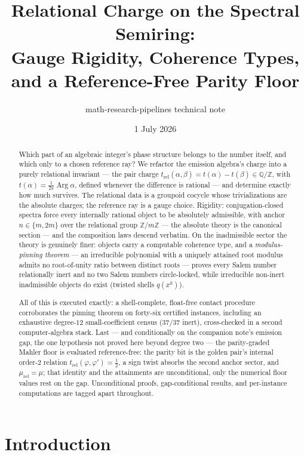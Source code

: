 \documentclass[11pt]{article}
\title{Relational Charge on the Spectral Semiring:\\
Gauge Rigidity, Coherence Types, and a Reference-Free Parity Floor}
\author{math-research-pipelines technical note}
\date{1 July 2026}
\theoremstyle{plain}
\theoremstyle{definition}
\theoremstyle{remark}
\newcommand{\Q}{\mathbb{Q}}
\newcommand{\Z}{\mathbb{Z}}
\DeclareMathOperator{\Arg}{Arg}
\begin{document}
\maketitle

\begin{abstract}
Which part of an algebraic integer's phase structure belongs to the number
itself, and which only to a chosen reference ray? We refactor the emission
algebra's charge into a purely relational invariant --- the pair charge
$t_{\mathrm{rel}}(\alpha,\beta)=t(\alpha)-t(\beta)\in\Q/\Z$, with
$t(\alpha)=\frac{1}{2\pi}\Arg\alpha$, defined whenever the difference is
rational --- and determine exactly how much
survives. The relational data is a groupoid cocycle whose trivializations
are the absolute charges; the reference ray is a gauge choice. Rigidity:
conjugation-closed spectra force every internally rational object to be
absolutely admissible, with anchor $n\in\{m,2m\}$ over the relational group
$\Z/m\Z$ --- the absolute theory is the canonical section --- and the
composition laws descend verbatim. On the inadmissible sector the theory is
genuinely finer: objects carry a computable coherence type, and a
\emph{modulus-pinning theorem} --- an irreducible polynomial with a
uniquely attained root modulus admits no root-of-unity ratio between
distinct roots --- proves every Salem number relationally inert and no two
Salem numbers circle-locked, while irreducible non-inert inadmissible
objects do exist (twisted shells $q(x^k)$).

All of this is executed exactly: a shell-complete, float-free contact
procedure corroborates the pinning theorem on forty-six certified
instances, including an exhaustive degree-$12$ small-coefficient census
($37/37$ inert), cross-checked in a second computer-algebra stack. Last ---
and conditionally on the companion note's emission gap, the one hypothesis
not proved here beyond degree two --- the parity-graded Mahler floor is
evaluated reference-free: the parity bit is the golden pair's internal
order-$2$ relation $t_{\mathrm{rel}}(\varphi,\varphi')=\tfrac12$, a sign
twist absorbs the second anchor sector, and
$\mu_{\mathrm{rel}}=\mu$; that identity and the attainments are
unconditional, only the numerical floor values rest on the gap.
Unconditional proofs, gap-conditional results, and per-instance
computations are tagged apart throughout.
\end{abstract}

\section{Introduction}
\end{document}
